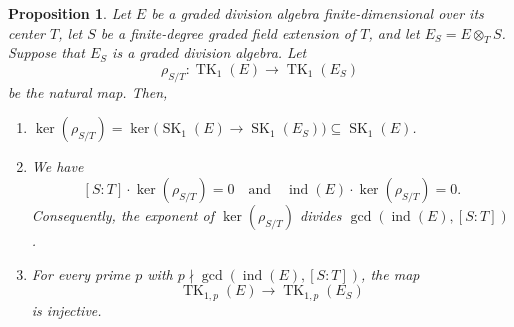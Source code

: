 \documentclass[11pt]{article}
\numberwithin{equation}{section}
\theoremstyle{plain}
\newtheorem{proposition}[theorem]{Proposition}
\theoremstyle{remark}
\newcommand{\opn}{\operatorname}
\begin{document}
\begin{proposition}
Let $E$ be a graded division algebra finite-dimensional over its center $T$,  let $S$ be a finite-degree
 graded field extension of $T$, and let $E_S = E \otimes_T S$.  Suppose that $E_S$ is a graded division
 algebra.  Let
$$
        \rho_{S/T}:\operatorname{TK}_1(E)\longrightarrow \operatorname{TK}_1(E_S)
$$
be the natural map.  Then,
\begin{enumerate}[font=\normalfont]
\item[(i)]
$\ker(\rho_{S/T}) =  \ker\bigl(\opn{SK}_1(E)\longrightarrow \opn{SK}_1(E_S)\bigr)
\subseteq \operatorname{SK}_1(E)$.
\item[(ii)]
We have 
$$
[S:T]\cdot\ker(\rho_{S/T})=0 \quad \text{and} \quad\operatorname{ind}(E)\cdot\ker(\rho_{S/T})=0.
$$
Consequently, the exponent of $\ker(\rho_{S/T})$ divides $\gcd(\operatorname{ind}(E),[S:T])$.  
\item[(iii)]
For every prime $p$ with $p\nmid \gcd(\operatorname{ind}(E),[S:T])$, the map
$$
        \operatorname{TK}_{1,p}(E)\longrightarrow \operatorname{TK}_{1,p}(E_S)
$$
is injective.
\end{enumerate}
\end{proposition}
\end{document}
